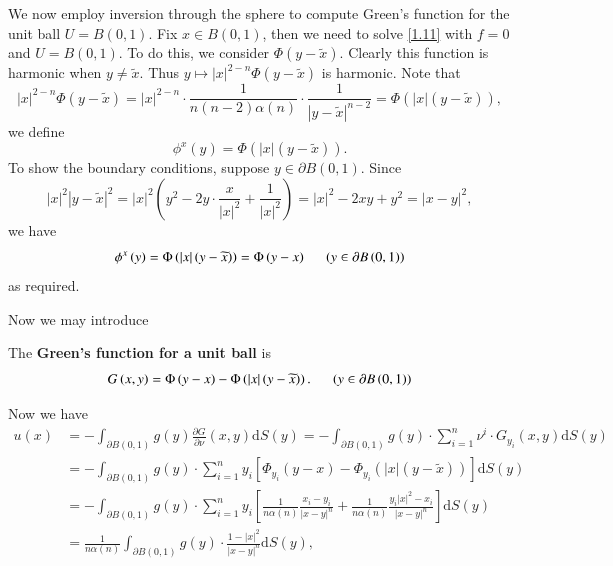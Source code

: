 We now employ inversion through the sphere to compute Green's function for the unit ball $U=B(0,1)$. Fix $x\in B(0,1)$, then we need to solve \eqref{1.11} with $f=0$ and $U=B(0,1)$. To do this, we consider $\Phi(y-\widetilde{x})$. Clearly this function is harmonic when $y\ne\widetilde{x}$. Thus $y\mapsto|x|^{2-n}\Phi(y-\widetilde{x})$ is harmonic. Note that 
$$
\left| x \right|^{2-n}\Phi \left( y-\widetilde{x} \right) =\left| x \right|^{2-n}\cdot \frac{1}{n\left( n-2 \right) \alpha \left( n \right)}\cdot \frac{1}{\left| y-\widetilde{x} \right|^{n-2}}=\Phi \left( \left| x \right|\left( y-\widetilde{x} \right) \right) ,
$$
we define 
$$
\phi ^x\left( y \right) =\Phi \left( \left| x \right|\left( y-\widetilde{x} \right) \right) .
$$
To show the boundary conditions, suppose $y\in\partial B(0,1)$. Since 
$$
\left| x \right|^2\left| y-\widetilde{x} \right|^2=\left| x \right|^2\left( y^2-2y\cdot \frac{x}{\left| x \right|^2}+\frac{1}{\left| x \right|^2} \right) =\left| x \right|^2-2xy+y^2=\left| x-y \right|^2,
$$
we have 
$$
\phi ^x\left( y \right) =\Phi \left( \left| x \right|\left( y-\widetilde{x} \right) \right) =\Phi \left( y-x \right) \hspace{0.5cm}\left( y\in \partial B\left( 0,1 \right) \right) 
$$
as required.\par
Now we may introduce 
\begin{definition}
The \textbf{Green's function for a unit ball} is 
$$
G\left( x,y \right) =\Phi \left( y-x \right) -\Phi \left( \left| x \right|\left( y-\widetilde{x} \right) \right) .\hspace{0.5cm}\left( y\in \partial B\left( 0,1 \right) \right) 
$$
\end{definition}
Now we have 
$$
\begin{aligned}
u\left( x \right) &=-\int_{\partial B\left( 0,1 \right)}{g\left( y \right) \frac{\partial G}{\partial \nu}\left( x,y \right) \mathrm{d}S\left( y \right)}=-\int_{\partial B\left( 0,1 \right)}{g\left( y \right) \cdot \sum_{i=1}^n{\nu ^i\cdot G_{y_i}\left( x,y \right) \mathrm{d}S\left( y \right)}}
\\
&=-\int_{\partial B\left( 0,1 \right)}{g\left( y \right) \cdot \sum_{i=1}^n{y_i\left[ \Phi _{y_i}\left( y-x \right) -\Phi _{y_i}\left( \left| x \right|\left( y-\widetilde{x} \right) \right) \right]}\mathrm{d}S\left( y \right)}
\\
&=-\int_{\partial B\left( 0,1 \right)}{g\left( y \right) \cdot \sum_{i=1}^n{y_i\left[ \frac{1}{n\alpha \left( n \right)}\frac{x_i-y_i}{\left| x-y \right|^n}+\frac{1}{n\alpha \left( n \right)}\frac{y_i\left| x \right|^2-x_i}{\left| x-y \right|^n} \right]}\mathrm{d}S\left( y \right)}
\\
&=\frac{1}{n\alpha \left( n \right)}\int_{\partial B\left( 0,1 \right)}{g\left( y \right) \cdot \frac{1-\left| x \right|^2}{\left| x-y \right|^n}\mathrm{d}S\left( y \right)},
\end{aligned}
$$
